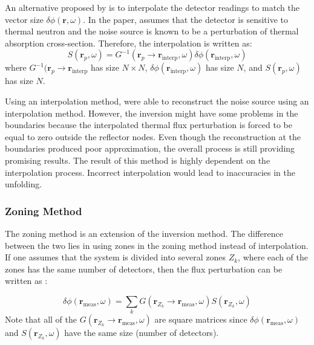 An alternative proposed by \cite{demaziereIdentificationLocalizationAbsorbers2005} is to interpolate the detector readings to match the vector size $\delta \phi (\textbf{r},\omega)$. In the paper, \cite{demaziereIdentificationLocalizationAbsorbers2005} assumes that the detector is sensitive to thermal neutron and the noise source is known to be a perturbation of thermal absorption cross-section. Therefore, the interpolation is written as:
\begin{equation}
    S(\textbf{r}_p, \omega) = G^{-1}(\textbf{r}_p \rightarrow \textbf{r}_{\text{interp}}, \omega) \delta \phi (\textbf{r}_{\text{interp}},\omega) 
    \label{eq:source_inversion_matrix2}
\end{equation}
where $G^{-1}(\textbf{r}_p \rightarrow \textbf{r}_{\text{interp}}$ has size $N \times N$, $\delta \phi (\textbf{r}_{\text{interp}},\omega)$ has size $N$, and $S(\textbf{r}_p, \omega)$ has size $N$.

Using an interpolation method, \cite{demaziereIdentificationLocalizationAbsorbers2005} were able to reconstruct the noise source using an interpolation method. However, the inversion might have some problems in the boundaries because the interpolated thermal flux perturbation is forced to be equal to zero outside the reflector nodes. Even though the reconstruction at the boundaries produced poor approximation, the overall process is still providing promising results. The result of this method is highly dependent on the interpolation process. Incorrect interpolation would lead to inaccuracies in the unfolding.

\subsubsection{Zoning Method}

The zoning method is an extension of the inversion method. The difference between the two lies in using zones in the zoning method instead of interpolation. If one assumes that the system is divided into several zones $Z_k$, where each of the zones has the same number of detectors, then the flux perturbation can be written as \cite{demaziereIdentificationLocalizationAbsorbers2005}:

\begin{equation}
    \delta \phi (\textbf{r}_{\text{meas}},\omega) = \sum_{k} G(\textbf{r}_{Z_k} \rightarrow \textbf{r}_{\text{meas}}, \omega) S(\textbf{r}_{Z_k}, \omega)
    \label{eq:zoning_definition}
\end{equation}
Note that all of the $G(\textbf{r}_{Z_k} \rightarrow \textbf{r}_{\text{meas}}, \omega)$ are square matrices since $\delta \phi (\textbf{r}_{\text{meas}},\omega)$ and $S(\textbf{r}_{Z_k}, \omega)$ have the same size (number of detectors).

